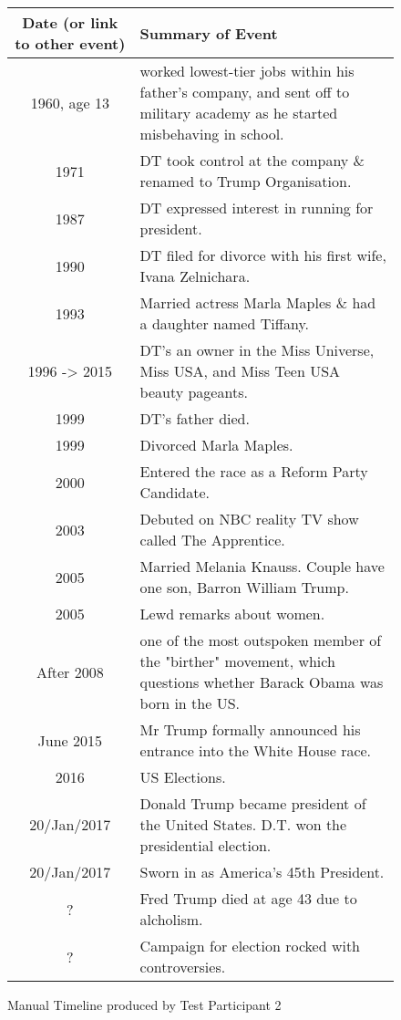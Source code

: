 \begin{figure}[H]
\begin{tabular}{|c|p{8.5cm}|}
\hline
Date (or link to other event) & Summary of Event\\
\hline
\hline
1960, age 13 & worked lowest-tier jobs within his father's company, and sent off to military academy as he started misbehaving in school.\\
\hline
1971 & DT took control at the company \& renamed to Trump Organisation.\\
\hline
1987 & DT expressed interest in running for president.\\
\hline
1990 & DT filed for divorce with his first wife, Ivana Zelnichara.\\
\hline
1993 & Married actress Marla Maples \& had a daughter named Tiffany.\\
\hline
1996 -> 2015 &  DT's an owner in the Miss Universe, Miss USA, and Miss Teen USA beauty pageants.\\
\hline
1999 & DT's father died.\\
\hline
1999 & Divorced Marla Maples.\\
\hline
2000 & Entered the race as a Reform Party Candidate.\\
\hline
2003 & Debuted on NBC reality TV show called The Apprentice.\\
\hline
2005 & Married Melania Knauss. Couple have one son, Barron William Trump.\\
\hline
2005 & Lewd remarks about women.\\
\hline
After 2008 & one of the most outspoken member of the "birther" movement, which questions whether Barack Obama was born in the US.\\
\hline
June 2015 & Mr Trump formally announced his entrance into the White House race.\\
\hline
2016 & US Elections.\\
\hline
20/Jan/2017 & Donald Trump became president of the United States. D.T. won the presidential election.\\
\hline
20/Jan/2017 & Sworn in as America's 45th President.\\
\hline
? & Fred Trump died at age 43 due to alcholism.\\
\hline
? & Campaign for election rocked with controversies.\\
\hline
\end{tabular}
\caption{Manual Timeline produced by Test Participant 2}
\end{figure}

